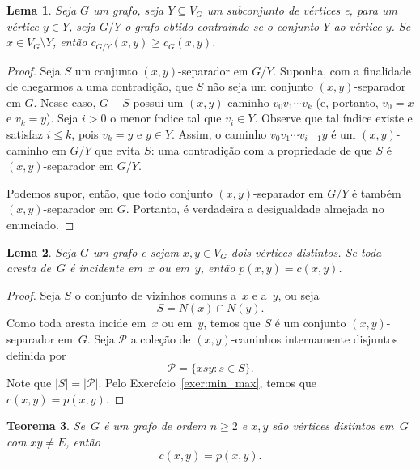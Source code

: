 \documentclass[12pt, a4paper]{article}
\newtheorem{teor}{Teorema}[section]
\newtheorem{lema}[teor]{Lema}
\theoremstyle{definition}
\begin{document}
\begin{lema}
\label{lema:c_contracted}
Seja $G$ um grafo, seja $Y \subseteq V_G$ um subconjunto de vértices e, para um vértice $y \in Y$, seja $G/Y$ o grafo obtido contraindo-se o conjunto $Y$ ao vértice $y$. Se $x \in V_G \setminus Y$, então $c_{G/Y}(x,y) \geq c_G(x,y)$.
\end{lema}

\begin{proof}
  Seja $S$ um conjunto $(x,y)$-separador em $G/Y$. Suponha, com a finalidade de chegarmos a uma contradição, que $S$ não seja um conjunto $(x,y)$-separador em $G$. Nesse caso, $G - S$ possui um $(x,y)$-caminho $v_0 v_1 \cdots v_k$ (e, portanto, $v_0 = x$ e $v_k = y$). Seja $i > 0$ o menor índice tal que $v_i \in Y$. Observe que tal índice existe e satisfaz $i \leq k$, pois $v_k = y$ e $y \in Y$. Assim, o caminho $v_0 v_1 \cdots v_{i-1} y$ é um $(x,y)$-caminho em $G/Y$ que evita $S$: uma contradição com a propriedade de que $S$ é $(x,y)$-separador em $G/Y$. 

Podemos supor, então, que todo conjunto $(x,y)$-separador em $G/Y$ é também $(x,y)$-separador em $G$. Portanto, é verdadeira a desigualdade almejada no enunciado.
\end{proof}

\begin{lema}
\label{lema:all_paths_size_2}
Seja $G$ um grafo e sejam $x,y \in V_G$ dois vértices distintos. Se toda aresta de~$G$ é incidente em~$x$ ou em~$y$, então $p(x,y) = c(x,y)$.
\end{lema}

\begin{proof}
Seja $S$ o conjunto de vizinhos comuns a~$x$ e a~$y$, ou seja
\[ S = N(x) \cap N(y). \]
Como toda aresta incide em~$x$ ou em~$y$, temos que $S$ é um conjunto $(x,y)$-separador em~$G$. Seja $\mathcal{P}$ a coleção de $(x,y)$-caminhos internamente disjuntos definida por
\[ \mathcal{P} = \{xsy \colon s \in S\}. \]
Note que $|S| = |\mathcal{P}|$. Pelo Exercício~\ref{exer:min_max}, temos que $c(x,y) = p(x,y)$.
\end{proof}


\begin{teor}
\label{teor:menger}
Se~$G$ é um grafo de ordem $n \geq 2$ e $x,y$ são vértices distintos em~$G$ com $xy \neq E$, então
\begin{equation}
  \label{eq:min_max_conn2}
  c(x,y) = p(x,y).
\end{equation}
\end{teor}
\end{document}
